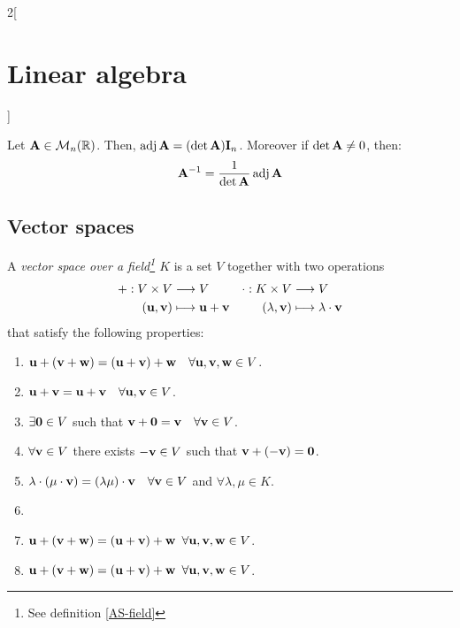 \documentclass[../../../main.tex]{subfiles}
\begin{document}
\begin{multicols}{2}[\section{Linear algebra}]
\begin{definition}
\end{definition}
\begin{theorem}
    Let $\vb{A}\in\mathcal{M}_n(\mathbb{R})$. Then, $\operatorname{adj}\vb{A}=(\det \vb{A})\vb{I}_n$. Moreover if $\det \vb{A}\ne 0$, then: $$\vb{A}^{-1}=\frac{1}{\det \vb{A}}\operatorname{adj}\vb{A}$$
\end{theorem}
\subsection{Vector spaces}
\begin{definition}
    A \textit{vector space over a field\footnote{See definition \ref{AS-field}} $K$} is a set $V$ together with two operations
    \begin{align*}
        +:V\times V&\longrightarrow V&\cdot:K\times V&\longrightarrow V\\
        (\vb{u},\vb{v})&\longmapsto \vb{u}+ \vb{v}&(\lambda,\vb{v})&\longmapsto \lambda\cdot \vb{v}
    \end{align*}
    that satisfy the following properties:
    \begin{enumerate}
        \item $\vb{u}+(\vb{v}+\vb{w})=(\vb{u}+\vb{v})+\vb{w}\quad\forall\vb{u},\vb{v},\vb{w}\in V$.
        \item $\vb{u}+\vb{v}=\vb{u}+\vb{v}\quad\forall\vb{u},\vb{v}\in V$.
        \item $\exists\vb{0}\in V$ such that $\vb{v}+\vb{0}=\vb{v}\quad\forall\vb{v}\in V$.
        \item $\forall\vb{v}\in V$ there exists $-\vb{v}\in V$ such that $\vb{v}+(-\vb{v})=\vb{0}$.                  
        \item $\lambda\cdot(\mu\cdot\vb{v})=(\lambda\mu)\cdot\vb{v}\quad\forall\vb{v}\in V$ and $\forall\lambda,\mu\in K$.
        \item  
        \item $\vb{u}+(\vb{v}+\vb{w})=(\vb{u}+\vb{v})+\vb{w}$ $\forall\vb{u},\vb{v},\vb{w}\in V$.
        \item $\vb{u}+(\vb{v}+\vb{w})=(\vb{u}+\vb{v})+\vb{w}$ $\forall\vb{u},\vb{v},\vb{w}\in V$.

\end{enumerate}
\end{definition}
\end{multicols}
\end{document}
